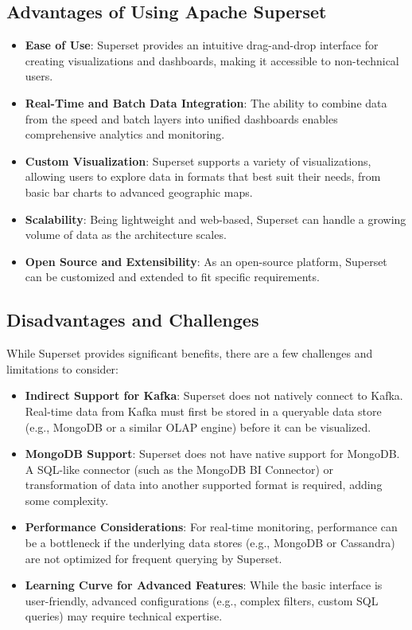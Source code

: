 \documentclass[12pt,a4paper, hidelinks]{article}
\begin{document}
\subsection{Advantages of Using Apache Superset}
\begin{itemize}
    \item \textbf{Ease of Use}: Superset provides an intuitive drag-and-drop interface for creating visualizations and dashboards, making it accessible to non-technical users.
    \item \textbf{Real-Time and Batch Data Integration}: The ability to combine data from the speed and batch layers into unified dashboards enables comprehensive analytics and monitoring.
    \item \textbf{Custom Visualization}: Superset supports a variety of visualizations, allowing users to explore data in formats that best suit their needs, from basic bar charts to advanced geographic maps.
    \item \textbf{Scalability}: Being lightweight and web-based, Superset can handle a growing volume of data as the architecture scales.
    \item \textbf{Open Source and Extensibility}: As an open-source platform, Superset can be customized and extended to fit specific requirements.
\end{itemize}

\subsection{Disadvantages and Challenges}
While Superset provides significant benefits, there are a few challenges and limitations to consider:
\begin{itemize}
    \item \textbf{Indirect Support for Kafka}: Superset does not natively connect to Kafka. Real-time data from Kafka must first be stored in a queryable data store (e.g., MongoDB or a similar OLAP engine) before it can be visualized.
    \item \textbf{MongoDB Support}: Superset does not have native support for MongoDB. A SQL-like connector (such as the MongoDB BI Connector) or transformation of data into another supported format is required, adding some complexity.
    \item \textbf{Performance Considerations}: For real-time monitoring, performance can be a bottleneck if the underlying data stores (e.g., MongoDB or Cassandra) are not optimized for frequent querying by Superset.
    \item \textbf{Learning Curve for Advanced Features}: While the basic interface is user-friendly, advanced configurations (e.g., complex filters, custom SQL queries) may require technical expertise.
\end{itemize}
\end{document}
